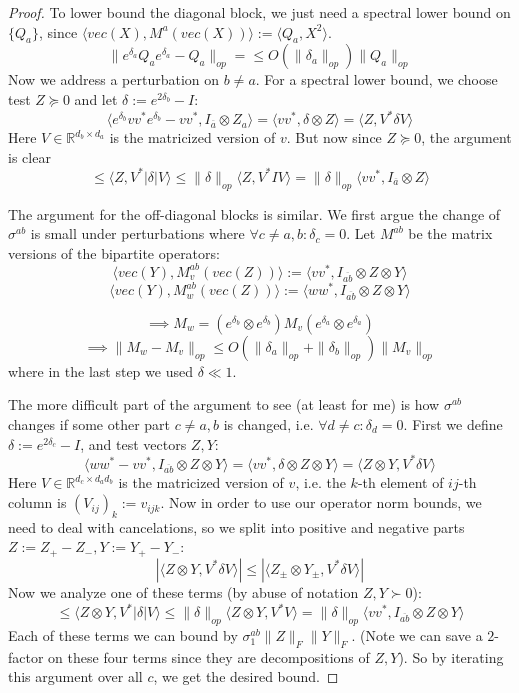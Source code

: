 \documentclass{article}
\newcommand{\R}{{\mathbb{R}}}
\begin{document}
\begin{proof}
To lower bound the diagonal block, we just need a spectral lower bound on $\{Q_{a}\}$, since $\langle vec(X), M^{a} (vec(X)) \rangle := \langle Q_{a}, X^{2} \rangle$.
\[ \| e^{\delta_{a}} Q_{a} e^{\delta_{a}} - Q_{a}\|_{op} = \leq O(\|\delta_{a}\|_{op}) \|Q_{a}\|_{op}   \]
Now we address a perturbation on $b \neq a$. For a spectral lower bound, we choose test $Z \succeq 0$ and let $\delta := e^{2\delta_{b}} - I$:
\[ \langle e^{\delta_{b}} v v^{*} e^{\delta_{b}} - v v^{*}, I_{\overline{a}} \otimes Z_{a} \rangle
= \langle v v^{*}, \delta \otimes Z \rangle = \langle Z, V^{*} \delta V \rangle   \]
Here $V \in \R^{d_{b} \times d_{a}}$ is the matricized version of $v$. But now since $Z \succeq 0$, the argument is clear
\[ \leq \langle Z, V^{*} |\delta| V \rangle \leq \|\delta\|_{op} \langle Z, V^{*} I V \rangle = \|\delta\|_{op} \langle v v^{*}, I_{\overline{a}} \otimes Z \rangle     \]

The argument for the off-diagonal blocks is similar. We first argue the change of $\sigma^{ab}$ is small under perturbations where $\forall c \neq a,b: \delta_{c} = 0$. Let $M^{ab}$ be the matrix versions of the bipartite operators:
\[ \langle vec(Y), M_{v}^{ab}(vec(Z)) \rangle := \langle v v^{*}, I_{\overline{ab}} \otimes Z \otimes Y \rangle \]
\[ \langle vec(Y), M_{w}^{ab}(vec(Z)) \rangle := \langle w w^{*}, I_{\overline{ab}} \otimes Z \otimes Y \rangle\]

\[ \implies M_{w} = (e^{\delta_{b}} \otimes e^{\delta_{b}}) M_{v} (e^{\delta_{a}} \otimes e^{\delta_{a}})   \]
\[ \implies \|M_{w} - M_{v}\|_{op} \leq O(\|\delta_{a}\|_{op} + \|\delta_{b}\|_{op}) \|M_{v}\|_{op}   \]
where in the last step we used $\delta \ll 1$.

The more difficult part of the argument to see (at least for me) is how $\sigma^{ab}$ changes if some other part $c \neq a,b$ is changed, i.e. $\forall d \neq c: \delta_{d} = 0$. First we define $\delta := e^{2 \delta_{c}} - I$, and test vectors $Z,Y$:
\[ \langle w w^{*} - v v^{*}, I_{\overline{ab}} \otimes Z \otimes Y \rangle = \langle v v^{*}, \delta \otimes Z \otimes Y \rangle  = \langle Z \otimes Y, V^{*} \delta V \rangle \]
Here $V \in \R^{d_{c} \times d_{a}d_{b}}$ is the matricized version of $v$, i.e. the $k$-th element of $ij$-th column is $(V_{ij})_{k} := v_{ijk}$. Now in order to use our operator norm bounds, we need to deal with cancelations, so we split into positive and negative parts $Z := Z_{+} - Z_{-}, Y := Y_{+} - Y_{-}$:
\[ |\langle Z \otimes Y, V^{*} \delta V \rangle| \leq |\langle Z_{\pm} \otimes Y_{\pm}, V^{*} \delta V \rangle |  \]
Now we analyze one of these terms (by abuse of notation $Z, Y \succ 0$):
\[ \leq \langle Z \otimes Y, V^{*} |\delta| V \rangle \leq \|\delta\|_{op} \langle Z \otimes Y, V^{*} V \rangle = \|\delta\|_{op} \langle v v^{*}, I_{\overline{ab}} \otimes Z \otimes Y \rangle   \]
Each of these terms we can bound by $\sigma^{ab}_{1} \|Z\|_{F} \|Y\|_{F}$. (Note we can save a $2$-factor on these four terms since they are decompositions of $Z,Y$). So by iterating this argument over all $c$, we get the desired bound.
\end{proof}
\end{document}
